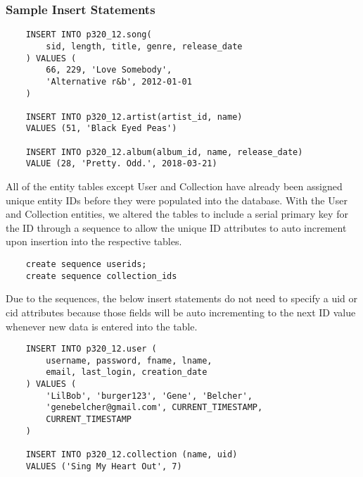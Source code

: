 \documentclass[12pt]{article}
\begin{document}
    \subsubsection{Sample Insert Statements}
    \begin{lstlisting}
    INSERT INTO p320_12.song(
        sid, length, title, genre, release_date
    ) VALUES (
        66, 229, 'Love Somebody',
        'Alternative r&b', 2012-01-01
    )

    INSERT INTO p320_12.artist(artist_id, name)
    VALUES (51, 'Black Eyed Peas')

    INSERT INTO p320_12.album(album_id, name, release_date)
    VALUE (28, 'Pretty. Odd.', 2018-03-21)

    \end{lstlisting}
    All of the entity tables except User and Collection have already
    been assigned unique entity IDs before they were populated into
    the database. With the User and Collection entities, we altered the
    tables to include a serial primary key for the ID through a sequence
    to allow the unique ID attributes to auto increment upon insertion
    into the respective tables.
    \begin{lstlisting}
    create sequence userids;
    create sequence collection_ids
    \end{lstlisting}
    Due to the sequences, the below insert statements do not need to specify
    a uid or cid attributes because those fields will be auto incrementing
    to the next ID value whenever new data is entered into the table.
    \begin{lstlisting}
    INSERT INTO p320_12.user (
        username, password, fname, lname,
        email, last_login, creation_date
    ) VALUES (
        'LilBob', 'burger123', 'Gene', 'Belcher',
        'genebelcher@gmail.com', CURRENT_TIMESTAMP,
        CURRENT_TIMESTAMP
    )

    INSERT INTO p320_12.collection (name, uid)
    VALUES ('Sing My Heart Out', 7)
    \end{lstlisting}
\end{document}
